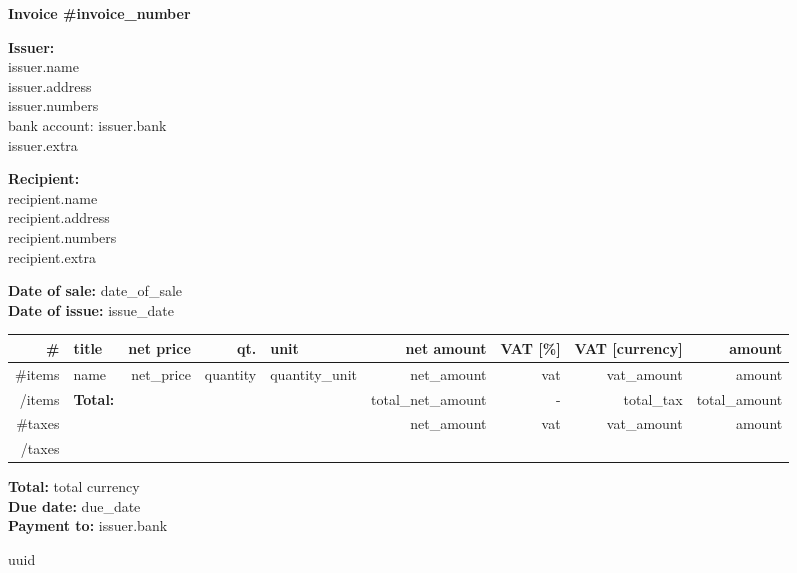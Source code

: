 \documentclass[11pt]{article}
\begin{document}
\begin{center}
  \Large
  \textbf{Invoice \#{{invoice_number}}}
\end{center}

\textbf{Issuer:} \\
       {{issuer.name}} \\
       {{issuer.address}} \\
       {{issuer.numbers}} \\
       bank account: {{issuer.bank}} \\
       {{issuer.extra}}

\textbf{Recipient:} \\
       {{recipient.name}} \\
       {{recipient.address}} \\
       {{recipient.numbers}} \\
       {{recipient.extra}}

\textbf{Date of sale:} {{date_of_sale}} \\
\textbf{Date of issue:} {{issue_date}}

\newcommand{\itemindex}{\stepcounter{ItemIndex} \theItemIndex}

\begin{center}
  \small
  \begin{tabular}{rlrrlrrrr}
    \# & title & net price & qt. & unit & net amount & VAT [\%] & VAT [{{currency}}] & amount \\
    \hline
    {{#items}}
     \itemindex & {{name}} & {{net_price}} & {{quantity}} & {{quantity_unit}} & {{net_amount}} & {{vat}} & {{vat_amount}} & {{amount}} \\
    {{/items}}

    \hline
    & \textbf{Total:} &  &  &  & {{total_net_amount}} & - & {{total_tax}} & {{total_amount}} \\
    {{#taxes}}
      &  &  &  &  & {{net_amount}} & {{vat}} & {{vat_amount}} & {{amount}} \\
    {{/taxes}}
  \end{tabular}
\end{center}

\textbf{Total:} {{total}} {{currency}} \\
\textbf{Due date:} {{due_date}} \\
\textbf{Payment to:} {{issuer.bank}}

\begin{center}
  \tiny
  {{uuid}}
\end{center}
\end{document}
